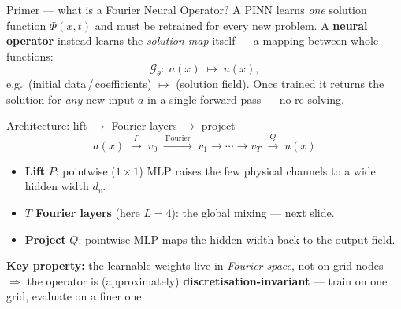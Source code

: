 \documentclass[aspectratio=169, 11pt]{beamer}
\newcommand{\pinn}{PINN}
\begin{document}
\begin{frame}{Primer --- what is a Fourier Neural Operator?}
  A \pinn{} learns \emph{one} solution function $\Phi(x,t)$ and must be retrained for
  every new problem. A \textbf{neural operator} instead learns the \emph{solution map}
  itself --- a mapping between whole functions:
  \[
    \mathcal{G}_\theta:\; a(x)\;\longmapsto\;u(x),
  \]
  e.g.\ (initial data\,/\,coefficients) $\mapsto$ (solution field). Once trained it returns
  the solution for \emph{any} new input $a$ in a single forward pass --- no re-solving.
  \medskip
  \begin{block}{\footnotesize Architecture: lift $\to$ Fourier layers $\to$ project}
    \footnotesize
    \[
      a(x)\;\xrightarrow{\;P\;}\;v_0\;\xrightarrow{\ \text{Fourier}\ }\;v_1\to\cdots\to v_T
      \;\xrightarrow{\;Q\;}\;u(x)
    \]
    \begin{itemize}
      \item \textbf{Lift} $P$: pointwise ($1{\times}1$) MLP raises the few physical
            channels to a wide hidden width $d_v$.
      \item \textbf{$T$ Fourier layers} (here $L\!=\!4$): the global mixing --- next slide.
      \item \textbf{Project} $Q$: pointwise MLP maps the hidden width back to the output field.
    \end{itemize}
  \end{block}
  \medskip
  \footnotesize \textbf{Key property:} the learnable weights live in \emph{Fourier space},
  not on grid nodes $\Rightarrow$ the operator is (approximately)
  \textbf{discretisation-invariant} --- train on one grid, evaluate on a finer one.
\end{frame}
\end{document}
